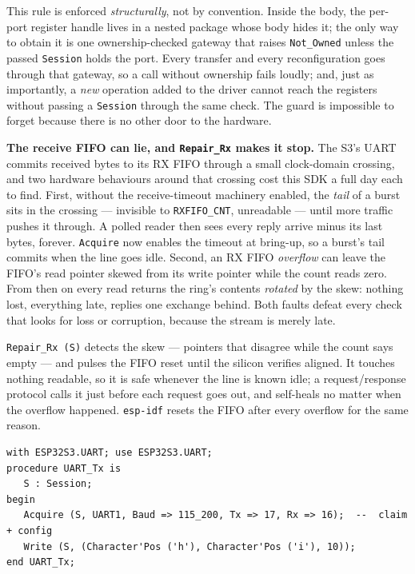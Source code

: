 This rule is enforced \emph{structurally}, not by convention. Inside the body,
the per-port register handle lives in a nested package whose body hides it; the
only way to obtain it is one ownership-checked gateway that raises
\texttt{Not\_Owned} unless the passed \texttt{Session} holds the port. Every
transfer and every reconfiguration goes through that gateway, so a call without
ownership fails loudly; and, just as importantly, a \emph{new} operation
added to the driver cannot reach the registers without passing a \texttt{Session}
through the same check. The guard is impossible to forget because there is no
other door to the hardware.

\textbf{The receive FIFO can lie, and \texttt{Repair\_Rx} makes it stop.}
The S3's UART commits received bytes to its RX FIFO through a small
clock-domain crossing, and two hardware behaviours around that crossing cost
this SDK a full day each to find. First, without the receive-timeout machinery
enabled, the \emph{tail} of a burst sits in the crossing --- invisible to
\texttt{RXFIFO\_CNT}, unreadable --- until more traffic pushes it through. A
polled reader then sees every reply arrive minus its last bytes, forever.
\texttt{Acquire} now enables the timeout at bring-up, so a burst's tail
commits when the line goes idle. Second, an RX FIFO \emph{overflow} can leave
the FIFO's read pointer skewed from its write pointer while the count reads
zero. From then on every read returns the ring's contents \emph{rotated} by
the skew: nothing lost, everything late, replies one exchange behind. Both
faults defeat every check that looks for loss or corruption, because the
stream is merely late.

\texttt{Repair\_Rx (S)} detects the skew --- pointers that disagree while the
count says empty --- and pulses the FIFO reset until the silicon verifies
aligned. It touches nothing readable, so it is safe whenever the line is known
idle; a request/response protocol calls it just before each request goes out,
and self-heals no matter when the overflow happened. \texttt{esp-idf} resets
the FIFO after every overflow for the same reason.


\begin{lstlisting}
with ESP32S3.UART; use ESP32S3.UART;
procedure UART_Tx is
   S : Session;
begin
   Acquire (S, UART1, Baud => 115_200, Tx => 17, Rx => 16);  --  claim + config
   Write (S, (Character'Pos ('h'), Character'Pos ('i'), 10));
end UART_Tx;
\end{lstlisting}

